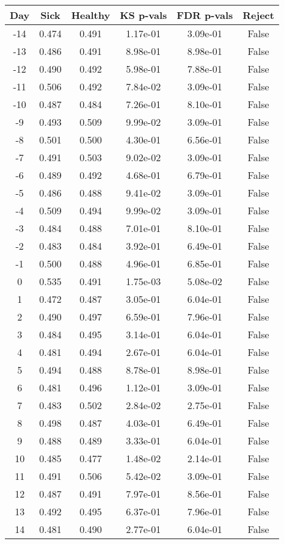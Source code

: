 \begin{tabular}{c|c|c|c|c|c}
Day &  Sick & Healthy &  KS p-vals & FDR p-vals & Reject\\
\hline
-14 & 0.474 &   0.491 &   1.17e-01 &   3.09e-01 &  False\\
-13 & 0.486 &   0.491 &   8.98e-01 &   8.98e-01 &  False\\
-12 & 0.490 &   0.492 &   5.98e-01 &   7.88e-01 &  False\\
-11 & 0.506 &   0.492 &   7.84e-02 &   3.09e-01 &  False\\
-10 & 0.487 &   0.484 &   7.26e-01 &   8.10e-01 &  False\\
 -9 & 0.493 &   0.509 &   9.99e-02 &   3.09e-01 &  False\\
 -8 & 0.501 &   0.500 &   4.30e-01 &   6.56e-01 &  False\\
 -7 & 0.491 &   0.503 &   9.02e-02 &   3.09e-01 &  False\\
 -6 & 0.489 &   0.492 &   4.68e-01 &   6.79e-01 &  False\\
 -5 & 0.486 &   0.488 &   9.41e-02 &   3.09e-01 &  False\\
 -4 & 0.509 &   0.494 &   9.99e-02 &   3.09e-01 &  False\\
 -3 & 0.484 &   0.488 &   7.01e-01 &   8.10e-01 &  False\\
 -2 & 0.483 &   0.484 &   3.92e-01 &   6.49e-01 &  False\\
 -1 & 0.500 &   0.488 &   4.96e-01 &   6.85e-01 &  False\\
  0 & 0.535 &   0.491 &   1.75e-03 &   5.08e-02 &  False\\
  1 & 0.472 &   0.487 &   3.05e-01 &   6.04e-01 &  False\\
  2 & 0.490 &   0.497 &   6.59e-01 &   7.96e-01 &  False\\
  3 & 0.484 &   0.495 &   3.14e-01 &   6.04e-01 &  False\\
  4 & 0.481 &   0.494 &   2.67e-01 &   6.04e-01 &  False\\
  5 & 0.494 &   0.488 &   8.78e-01 &   8.98e-01 &  False\\
  6 & 0.481 &   0.496 &   1.12e-01 &   3.09e-01 &  False\\
  7 & 0.483 &   0.502 &   2.84e-02 &   2.75e-01 &  False\\
  8 & 0.498 &   0.487 &   4.03e-01 &   6.49e-01 &  False\\
  9 & 0.488 &   0.489 &   3.33e-01 &   6.04e-01 &  False\\
 10 & 0.485 &   0.477 &   1.48e-02 &   2.14e-01 &  False\\
 11 & 0.491 &   0.506 &   5.42e-02 &   3.09e-01 &  False\\
 12 & 0.487 &   0.491 &   7.97e-01 &   8.56e-01 &  False\\
 13 & 0.492 &   0.495 &   6.37e-01 &   7.96e-01 &  False\\
 14 & 0.481 &   0.490 &   2.77e-01 &   6.04e-01 &  False\\
\end{tabular}